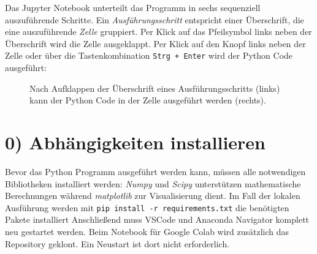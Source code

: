Das Jupyter Notebook unterteilt das Programm in sechs sequenziell auszuführende Schritte. Ein \textit{Ausführungsschritt} entspricht einer Überschrift, die eine auszuführende \textit{Zelle} gruppiert. Per Klick auf das Pfeilsymbol links neben der Überschrift wird die Zelle ausgeklappt. Per Klick auf den Knopf links neben der Zelle oder über die Tastenkombination \texttt{Strg + Enter} wird der Python Code ausgeführt:
\begin{figure}[H]
	\centering
	\footnotesize
	\centerline{}
	\caption{Nach Aufklappen der Überschrift eines Ausführungsschritts (links) kann der Python Code in der Zelle ausgeführt werden (rechts).}
\end{figure}

\section*{0) Abhängigkeiten installieren}
Bevor das Python Programm ausgeführt werden kann, müssen alle notwendigen Bibliotheken installiert werden: \textit{Numpy} und \textit{Scipy} unterstützen mathematische Berechnungen während \textit{matplotlib} zur Visualisierung dient. Im Fall der lokalen Ausführung werden mit \texttt{pip install -r requirements.txt} die benötigten Pakete installiert Anschließend muss VSCode und Anaconda Navigator komplett neu gestartet werden. Beim Notebook für Google Colab wird zusätzlich das Repository geklont. Ein Neustart ist dort nicht erforderlich.

